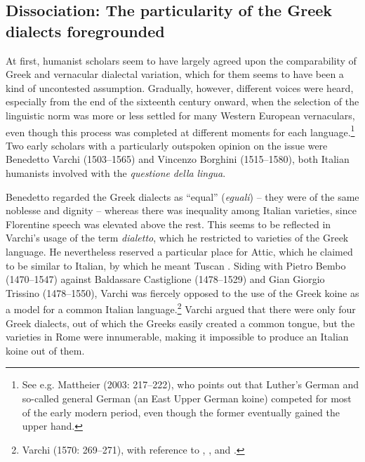 \subsection{Dissociation: The particularity of the Greek dialects foregrounded}

At first, humanist scholars seem to have largely agreed upon the comparability of Greek and vernacular dialectal variation, which for them seems to have been a kind of uncontested assumption. Gradually, however, different voices were heard, especially from the end of the sixteenth century onward, when the selection of the linguistic norm was more or less settled for many Western European vernaculars, even though this process was completed at different moments for each language.\footnote{See e.g. Mattheier (2003: 217–222), who points out that Luther’s German and so-called general German (an East Upper German koine) competed for most of the early modern period, even though the former eventually gained the upper hand.} Two early scholars with a particularly outspoken opinion on the issue were Benedetto Varchi (1503–1565) and Vincenzo Borghini (1515–1580), both Italian humanists involved with the \textit{questione} \textit{della} \textit{lingua}.

Benedetto \citet[95]{Varchi1570} regarded the Greek dialects as “equal” (\textit{eguali}) – they were of the same noblesse and dignity – whereas there was inequality among Italian varieties, since Florentine speech was elevated above the rest. This seems to be reflected in Varchi’s usage of the term \textit{dialetto}, which he restricted to varieties of the Greek language. He nevertheless reserved a particular place for Attic, which he claimed to be similar to Italian, by which he meant Tuscan \citep[141]{Varchi1570}. Siding with Pietro Bembo (1470–1547) against Baldassare Castiglione (1478–1529) and Gian Giorgio Trissino (1478–1550), Varchi was fiercely opposed to the use of the Greek koine as a model for a common Italian language.\footnote{Varchi (1570: 269–271), with reference to \citet{Bembo1525}, \citet{Castiglione1528}, and \citet{Trissino1529}.} Varchi argued that there were only four Greek dialects, out of which the Greeks easily created a common tongue, but the varieties in Rome were innumerable, making it impossible to produce an Italian koine out of them.

